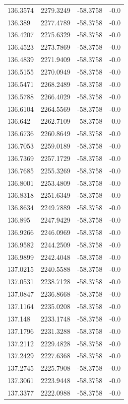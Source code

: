 \begin{table}[H]
\begin{tabular}{llll}
136.3574 & 2279.3249 & -58.3758 & -0.0 \\
136.389 & 2277.4789 & -58.3758 & -0.0 \\
136.4207 & 2275.6329 & -58.3758 & -0.0 \\
136.4523 & 2273.7869 & -58.3758 & -0.0 \\
136.4839 & 2271.9409 & -58.3758 & -0.0 \\
136.5155 & 2270.0949 & -58.3758 & -0.0 \\
136.5471 & 2268.2489 & -58.3758 & -0.0 \\
136.5788 & 2266.4029 & -58.3758 & -0.0 \\
136.6104 & 2264.5569 & -58.3758 & -0.0 \\
136.642 & 2262.7109 & -58.3758 & -0.0 \\
136.6736 & 2260.8649 & -58.3758 & -0.0 \\
136.7053 & 2259.0189 & -58.3758 & -0.0 \\
136.7369 & 2257.1729 & -58.3758 & -0.0 \\
136.7685 & 2255.3269 & -58.3758 & -0.0 \\
136.8001 & 2253.4809 & -58.3758 & -0.0 \\
136.8318 & 2251.6349 & -58.3758 & -0.0 \\
136.8634 & 2249.7889 & -58.3758 & -0.0 \\
136.895 & 2247.9429 & -58.3758 & -0.0 \\
136.9266 & 2246.0969 & -58.3758 & -0.0 \\
136.9582 & 2244.2509 & -58.3758 & -0.0 \\
136.9899 & 2242.4048 & -58.3758 & -0.0 \\
137.0215 & 2240.5588 & -58.3758 & -0.0 \\
137.0531 & 2238.7128 & -58.3758 & -0.0 \\
137.0847 & 2236.8668 & -58.3758 & -0.0 \\
137.1164 & 2235.0208 & -58.3758 & -0.0 \\
137.148 & 2233.1748 & -58.3758 & -0.0 \\
137.1796 & 2231.3288 & -58.3758 & -0.0 \\
137.2112 & 2229.4828 & -58.3758 & -0.0 \\
137.2429 & 2227.6368 & -58.3758 & -0.0 \\
137.2745 & 2225.7908 & -58.3758 & -0.0 \\
137.3061 & 2223.9448 & -58.3758 & -0.0 \\
137.3377 & 2222.0988 & -58.3758 & -0.0 \\

\end{tabular}
\end{table}
